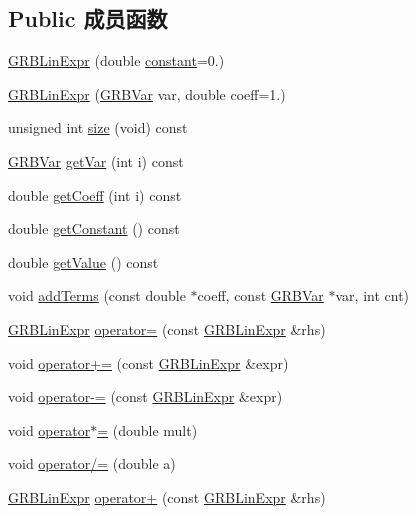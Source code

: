 \subsection*{Public 成员函数}
\begin{DoxyCompactItemize}
\item 
\hyperlink{classGRBLinExpr_a6d308acfca68887dac4843925aa2ab06}{G\+R\+B\+Lin\+Expr} (double \hyperlink{classGRBLinExpr_a3cbf5b4a570659fab686d349584d5614}{constant}=0.)
\item 
\hyperlink{classGRBLinExpr_a2c5be71c7868c786460f723c7570ee61}{G\+R\+B\+Lin\+Expr} (\hyperlink{classGRBVar}{G\+R\+B\+Var} var, double coeff=1.)
\item 
unsigned int \hyperlink{classGRBLinExpr_a02ac38b252b1848f20b8276321b2248f}{size} (void) const 
\item 
\hyperlink{classGRBVar}{G\+R\+B\+Var} \hyperlink{classGRBLinExpr_ad73e24304c81a6b003c950cd71db9af2}{get\+Var} (int i) const 
\item 
double \hyperlink{classGRBLinExpr_a1434367b8a05b14ad06b1342c74b7a5a}{get\+Coeff} (int i) const 
\item 
double \hyperlink{classGRBLinExpr_a4fb39d2dafff31f7bbc02db2cc5dc079}{get\+Constant} () const 
\item 
double \hyperlink{classGRBLinExpr_aec9ba00d4ef639332048bc2e38bbb27f}{get\+Value} () const 
\item 
void \hyperlink{classGRBLinExpr_a8518bb8a516ce7257d87caf1c970c2e5}{add\+Terms} (const double $\ast$coeff, const \hyperlink{classGRBVar}{G\+R\+B\+Var} $\ast$var, int cnt)
\item 
\hyperlink{classGRBLinExpr}{G\+R\+B\+Lin\+Expr} \hyperlink{classGRBLinExpr_aefd20a3bbfff0cf823998d4fe945aaad}{operator=} (const \hyperlink{classGRBLinExpr}{G\+R\+B\+Lin\+Expr} \&rhs)
\item 
void \hyperlink{classGRBLinExpr_a7489ab064252b75fe5a0637911adc448}{operator+=} (const \hyperlink{classGRBLinExpr}{G\+R\+B\+Lin\+Expr} \&expr)
\item 
void \hyperlink{classGRBLinExpr_a695a03ddb2ca3c36c5b58937072d171c}{operator-\/=} (const \hyperlink{classGRBLinExpr}{G\+R\+B\+Lin\+Expr} \&expr)
\item 
void \hyperlink{classGRBLinExpr_ab71f95ab71f47f698eafa01d582cb549}{operator$\ast$=} (double mult)
\item 
void \hyperlink{classGRBLinExpr_a0fded896dc63c3316dd3866ae5cb018c}{operator/=} (double a)
\item 
\hyperlink{classGRBLinExpr}{G\+R\+B\+Lin\+Expr} \hyperlink{classGRBLinExpr_a706e746f7ab762191964594cc8530c82}{operator+} (const \hyperlink{classGRBLinExpr}{G\+R\+B\+Lin\+Expr} \&rhs)

\end{DoxyCompactItemize}

